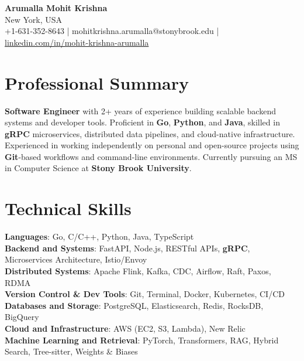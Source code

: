 \documentclass[letterpaper,11pt]{article}
\begin{document}
\begin{center}
  {\Large \textbf{Arumalla Mohit Krishna}} \\
  New York, USA \\
  +1-631-352-8643 \enspace | \enspace mohitkrishna.arumalla@stonybrook.edu \enspace | \enspace \href{https://www.linkedin.com/in/mohit-krishna-arumalla}{linkedin.com/in/mohit-krishna-arumalla}
\end{center}

\section{Professional Summary}
  \begin{itemize}[leftmargin=0.15in, label={}]
    \small{\item{
     \textbf{Software Engineer} with 2+ years of experience building scalable backend systems and developer tools. Proficient in \textbf{Go}, \textbf{Python}, and \textbf{Java}, skilled in \textbf{gRPC} microservices, distributed data pipelines, and cloud-native infrastructure. Experienced in working independently on personal and open-source projects using \textbf{Git}-based workflows and command-line environments. Currently pursuing an MS in Computer Science at \textbf{Stony Brook University}.
    }}
  \end{itemize}
\vspace{-16pt}

\section{Technical Skills}
 \begin{itemize}[leftmargin=0.15in, label={}]
    \small{\item{
     \textbf{Languages}: Go, C/C++, Python, Java, TypeScript \\
     \textbf{Backend and Systems}: FastAPI, Node.js, RESTful APIs, \textbf{gRPC}, Microservices Architecture, Istio/Envoy \\
     \textbf{Distributed Systems}: Apache Flink, Kafka, CDC, Airflow, Raft, Paxos, RDMA \\
     \textbf{Version Control \& Dev Tools}: Git, Terminal, Docker, Kubernetes, CI/CD \\
     \textbf{Databases and Storage}: PostgreSQL, Elasticsearch, Redis, RocksDB, BigQuery \\
     \textbf{Cloud and Infrastructure}: AWS (EC2, S3, Lambda), New Relic \\
     \textbf{Machine Learning and Retrieval}: PyTorch, Transformers, RAG, Hybrid Search, Tree-sitter, Weights \& Biases
    }}
 \end{itemize}
\vspace{-16pt}
\end{document}
